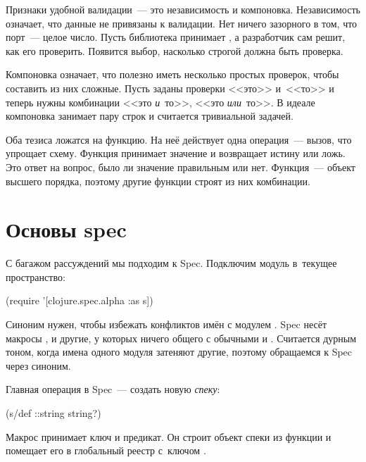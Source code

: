 
Признаки удобной валидации~--- это независимость и компоновка. Независимость
означает, что данные не привязаны к валидации. Нет ничего зазорного в том, что
порт~--- целое число. Пусть библиотека принимает , а разработчик
сам решит, как его проверить. Появится выбор, насколько строгой должна быть
проверка.


Компоновка означает, что полезно иметь несколько простых проверок, чтобы
составить из них сложные. Пусть заданы проверки <<это>> и~<<то>> и теперь нужны
комбинации <<это \emph{и}~то>>, <<это \emph{или}~то>>. В идеале компоновка
занимает пару строк и считается тривиальной задачей.


Оба тезиса ложатся на функцию. На неё действует одна операция~--- вызов, что
упрощает схему. Функция принимает значение и возвращает истину или ложь. Это
ответ на вопрос, было ли значение правильным или нет. Функция~--- объект высшего
порядка, поэтому другие функции строят из них комбинации.

\section{Основы spec}

С багажом рассуждений мы подходим к Spec. Подключим модуль в~текущее
пространство:


\begin{clojure}
(require '[clojure.spec.alpha :as s])
\end{clojure}


Синоним  нужен, чтобы избежать конфликтов имён с модулем
. Spec несёт макросы ,  и другие, у
которых ничего общего с обычными  и . Считается дурным тоном,
когда имена одного модуля затеняют другие, поэтому обращаемся к Spec через
синоним.


Главная операция в Spec~--- создать новую \emph{спеку}:


\begin{clojure}
(s/def ::string string?)
\end{clojure}



Макрос  принимает ключ и предикат. Он строит объект спеки из
функции  и помещает его в глобальный реестр с~ключом
.

